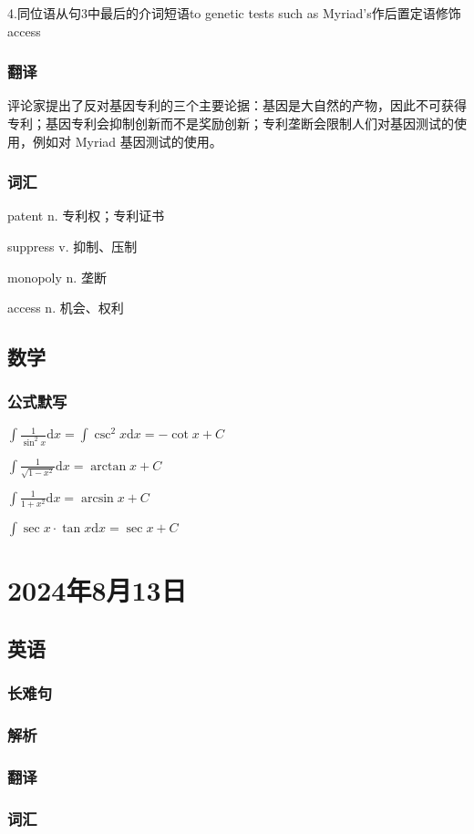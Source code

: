 \documentclass[UTF8]{ctexart}
\begin{document}
4.同位语从句3中最后的介词短语to genetic tests such as Myriad’s作后置定语修饰access
\subsubsection{翻译}
评论家提出了反对基因专利的三个主要论据：基因是大自然的产物，因此不可获得专利；基因专利会抑制创新而不是奖励创新；专利垄断会限制人们对基因测试的使用，例如对 Myriad 基因测试的使用。
\subsubsection{词汇}
patent      n.  专利权；专利证书

suppress    v.  抑制、压制

monopoly   n. 垄断

access     n. 机会、权利
\subsection{数学}
\subsubsection{公式默写}
\begin{multicols}{2}
      $\int\frac{1}{\sin^2x}\mathrm{d}x=\int\csc^2x\mathrm{d}x=-\cot x+C$

      $\int\frac{1}{\sqrt{1-x^2}}\mathrm{d}x=\arctan x+C$

      $\int\frac{1}{1+x^2}\mathrm{d}x=\arcsin x+C$

      $\int\sec x\cdot\tan x\mathrm{d}x=\sec x+C$
\end{multicols}
\section{2024年8月13日}
\subsection{英语}
\subsubsection{长难句}
\subsubsection{解析}
\subsubsection{翻译}
\subsubsection{词汇}
\end{document}
